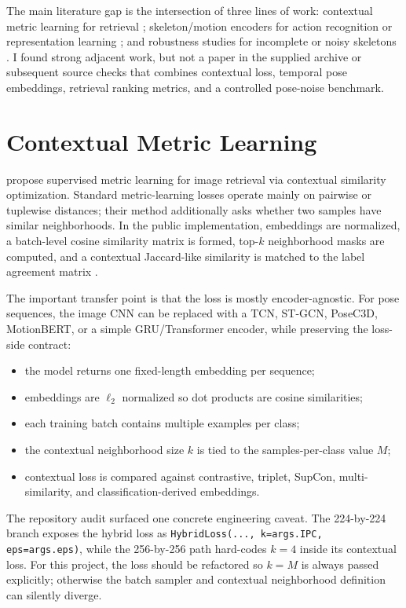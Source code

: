 \documentclass[11pt]{article}
\begin{document}
The main literature gap is the intersection of three lines of work: contextual metric learning for retrieval \citep{liao2023supervised}; skeleton/motion encoders for action recognition or representation learning \citep{yan2018stgcn,duan2022posec3d,zhu2023motionbert}; and robustness studies for incomplete or noisy skeletons \citep{song2020ragcn,shi2020prgcn}. I found strong adjacent work, but not a paper in the supplied archive or subsequent source checks that combines contextual loss, temporal pose embeddings, retrieval ranking metrics, and a controlled pose-noise benchmark.

\section{Contextual Metric Learning}

\citet{liao2023supervised} propose supervised metric learning for image retrieval via contextual similarity optimization. Standard metric-learning losses operate mainly on pairwise or tuplewise distances; their method additionally asks whether two samples have similar neighborhoods. In the public implementation, embeddings are normalized, a batch-level cosine similarity matrix is formed, top-$k$ neighborhood masks are computed, and a contextual Jaccard-like similarity is matched to the label agreement matrix \citep{contextualRepo}.

The important transfer point is that the loss is mostly encoder-agnostic. For pose sequences, the image CNN can be replaced with a TCN, ST-GCN, PoseC3D, MotionBERT, or a simple GRU/Transformer encoder, while preserving the loss-side contract:
\begin{itemize}
    \item the model returns one fixed-length embedding per sequence;
    \item embeddings are $\ell_2$ normalized so dot products are cosine similarities;
    \item each training batch contains multiple examples per class;
    \item the contextual neighborhood size $k$ is tied to the samples-per-class value $M$;
    \item contextual loss is compared against contrastive, triplet, SupCon, multi-similarity, and classification-derived embeddings.
\end{itemize}

The repository audit surfaced one concrete engineering caveat. The 224-by-224 branch exposes the hybrid loss as \texttt{HybridLoss(..., k=args.IPC, eps=args.eps)}, while the 256-by-256 path hard-codes $k=4$ inside its contextual loss. For this project, the loss should be refactored so $k=M$ is always passed explicitly; otherwise the batch sampler and contextual neighborhood definition can silently diverge.
\end{document}
